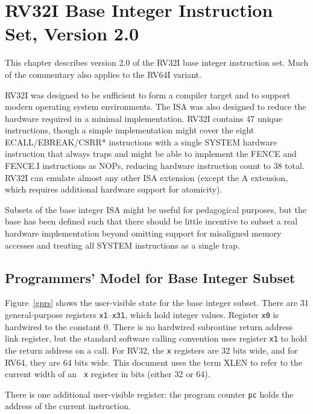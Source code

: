 \chapter{RV32I Base Integer Instruction Set, Version 2.0}
\label{rv32}

This chapter describes version 2.0 of the RV32I base integer
instruction set.  Much of the commentary also applies to the RV64I
variant.

\begin{commentary}
RV32I was designed to be sufficient to form a compiler target and to
support modern operating system environments.  The ISA was also
designed to reduce the hardware required in a minimal implementation.
RV32I contains 47 unique instructions, though a simple implementation
might cover the eight ECALL/EBREAK/CSRR* instructions with a single
SYSTEM hardware instruction that always traps and might be able to
implement the FENCE and FENCE.I instructions as NOPs, reducing
hardware instruction count to 38 total.  RV32I can emulate almost any
other ISA extension (except the A extension, which requires additional
hardware support for atomicity).

Subsets of the base integer ISA might be useful for pedagogical
purposes, but the base has been defined such that there should be
little incentive to subset a real hardware implementation beyond
omitting support for misaligned memory accesses and treating all SYSTEM
instructions as a single trap.
\end{commentary}

\section{Programmers' Model for Base Integer Subset}

Figure~\ref{gprs} shows the user-visible state for the base integer
subset.  There are 31 general-purpose registers {\tt x1}--{\tt x31},
which hold integer values.  Register {\tt x0} is hardwired to the
constant 0.  There is no hardwired subroutine return address link
register, but the standard software calling convention uses register
{\tt x1} to hold the return address on a call.  For RV32, the {\tt x}
registers are 32 bits wide, and for RV64, they are 64 bits wide.  This
document uses the term XLEN to refer to the current width of an {\tt
  x} register in bits (either 32 or 64).

There is one additional user-visible register: the program counter {\tt pc}
holds the address of the current instruction.

